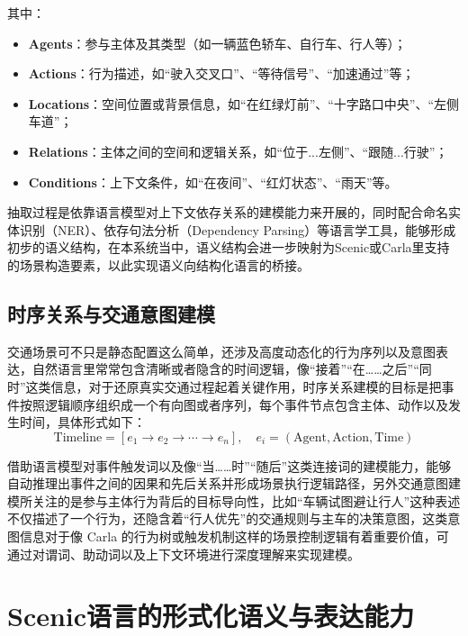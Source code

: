 其中：
\begin{itemize}
	\item \textbf{Agents}：参与主体及其类型（如一辆蓝色轿车、自行车、行人等）；
	\item \textbf{Actions}：行为描述，如“驶入交叉口”、“等待信号”、“加速通过”等；
	\item \textbf{Locations}：空间位置或背景信息，如“在红绿灯前”、“十字路口中央”、“左侧车道”；
	\item \textbf{Relations}：主体之间的空间和逻辑关系，如“位于...左侧”、“跟随...行驶”；
	\item \textbf{Conditions}：上下文条件，如“在夜间”、“红灯状态”、“雨天”等。
\end{itemize}

抽取过程是依靠语言模型对上下文依存关系的建模能力来开展的，同时配合命名实体识别（NER）、依存句法分析（Dependency Parsing）等语言学工具，能够形成初步的语义结构，在本系统当中，语义结构会进一步映射为Scenic或Carla里支持的场景构造要素，以此实现语义向结构化语言的桥接。

\subsection{时序关系与交通意图建模}

交通场景可不只是静态配置这么简单，还涉及高度动态化的行为序列以及意图表达，自然语言里常常包含清晰或者隐含的时间逻辑，像“接着”“在……之后”“同时”这类信息，对于还原真实交通过程起着关键作用，时序关系建模的目标是把事件按照逻辑顺序组织成一个有向图或者序列，每个事件节点包含主体、动作以及发生时间，具体形式如下：
\begin{equation}
	\text{Timeline} = \left[ e_1 \rightarrow e_2 \rightarrow \cdots \rightarrow e_n \right], \quad e_i = (\text{Agent}, \text{Action}, \text{Time})
\end{equation}

借助语言模型对事件触发词以及像“当……时”“随后”这类连接词的建模能力，能够自动推理出事件之间的因果和先后关系并形成场景执行逻辑路径，另外交通意图建模所关注的是参与主体行为背后的目标导向性，比如“车辆试图避让行人”这种表述不仅描述了一个行为，还隐含着“行人优先”的交通规则与主车的决策意图，这类意图信息对于像 Carla 的行为树或触发机制这样的场景控制逻辑有着重要价值，可通过对谓词、助动词以及上下文环境进行深度理解来实现建模。

\section{Scenic语言的形式化语义与表达能力}

